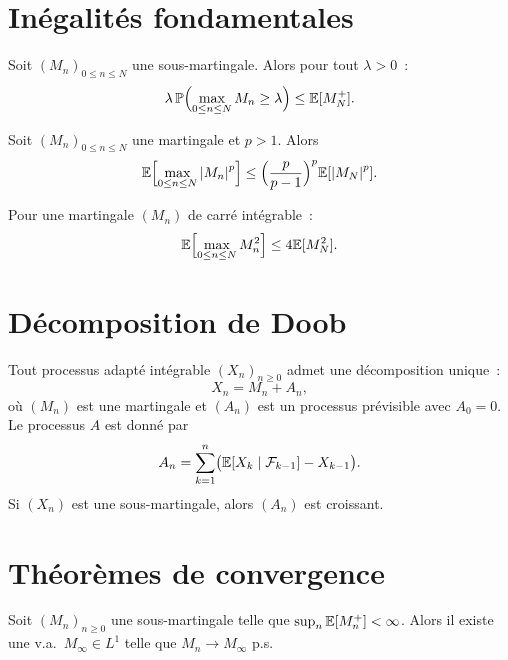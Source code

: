 \section{In\'egalit\'es fondamentales}

\begin{theoreme}
\label{thm:doob_maximal}
Soit $(M_n)_{0 \leq n \leq N}$ une sous-martingale. Alors pour tout $\lambda > 0$~:
\[
  \lambda \, \mathbb{P}\Bigl(\max_{0 \leq n \leq N} M_n \geq \lambda\Bigr)
  \leq \mathbb{E}[M_N^+].
\]
\end{theoreme}

\begin{theoreme}
\label{thm:doob_Lp}
Soit $(M_n)_{0 \leq n \leq N}$ une martingale et $p > 1$. Alors
\[
  \mathbb{E}\Bigl[\max_{0 \leq n \leq N} \left| M_n \right|^p\Bigr]
  \leq \Bigl(\frac{p}{p-1}\Bigr)^p \mathbb{E}[\left| M_N \right|^p].
\]
\end{theoreme}

\begin{theoreme}
\label{thm:doob_L2}
Pour une martingale $(M_n)$ de carr\'e int\'egrable~:
\[
  \mathbb{E}\Bigl[\max_{0 \leq n \leq N} M_n^2\Bigr] \leq 4 \mathbb{E}[M_N^2].
\]
\end{theoreme}

\section{D\'ecomposition de Doob}

\begin{theoreme}
\label{thm:doob_decomp}
Tout processus adapt\'e int\'egrable $(X_n)_{n \geq 0}$ admet une d\'ecomposition
unique~:
\[
  X_n = M_n + A_n,
\]
o\`u $(M_n)$ est une martingale et $(A_n)$ est un processus pr\'evisible avec
$A_0 = 0$. Le processus $A$ est donn\'e par
\[
  A_n = \sum_{k=1}^{n} \bigl(\mathbb{E}[X_k \mid \mathcal{F}_{k-1}] - X_{k-1}\bigr).
\]
Si $(X_n)$ est une sous-martingale, alors $(A_n)$ est croissant.
\end{theoreme}

\section{Th\'eor\`emes de convergence}

\begin{theoreme}
\label{thm:doob_convergence}
Soit $(M_n)_{n \geq 0}$ une sous-martingale telle que $\sup_n \mathbb{E}[M_n^+] < \infty$.
Alors il existe une v.a.\ $M_{\infty} \in L^1$ telle que $M_n \to M_{\infty}$
p.s.
\end{theoreme}

